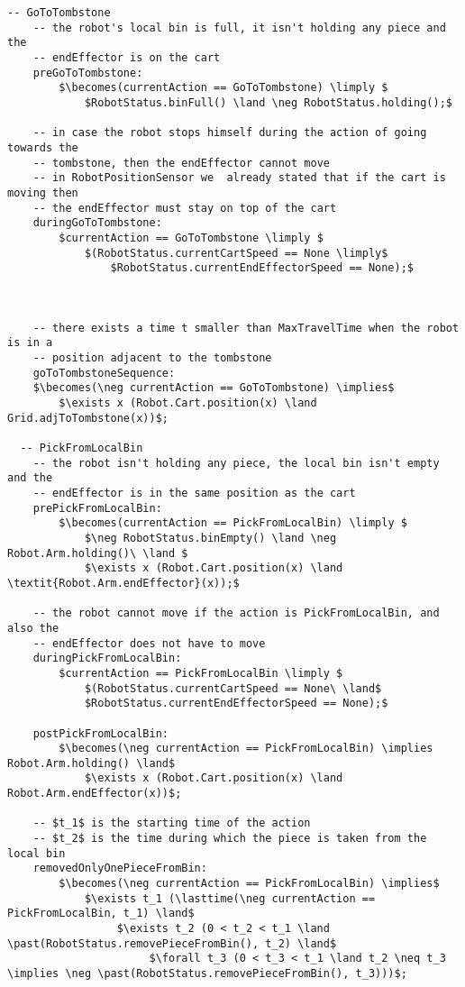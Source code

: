 \begin{lstlisting}[fontadjust, mathescape, frame=single]
  -- GoToTombstone
    -- the robot's local bin is full, it isn't holding any piece and the 
    -- endEffector is on the cart
    preGoToTombstone:
        $\becomes(currentAction == GoToTombstone) \limply $
            $RobotStatus.binFull() \land \neg RobotStatus.holding();$
    
    -- in case the robot stops himself during the action of going towards the 
    -- tombstone, then the endEffector cannot move 
    -- in RobotPositionSensor we  already stated that if the cart is moving then 
    -- the endEffector must stay on top of the cart
    duringGoToTombstone:
        $currentAction == GoToTombstone \limply $
            $(RobotStatus.currentCartSpeed == None \limply$ 
                $RobotStatus.currentEndEffectorSpeed == None);$



    -- there exists a time t smaller than MaxTravelTime when the robot is in a 
    -- position adjacent to the tombstone
    goToTombstoneSequence:
    $\becomes(\neg currentAction == GoToTombstone) \implies$
        $\exists x (Robot.Cart.position(x) \land Grid.adjToTombstone(x))$;

  -- PickFromLocalBin
    -- the robot isn't holding any piece, the local bin isn't empty and the 
    -- endEffector is in the same position as the cart
    prePickFromLocalBin:
        $\becomes(currentAction == PickFromLocalBin) \limply $
            $\neg RobotStatus.binEmpty() \land \neg Robot.Arm.holding()\ \land $
            $\exists x (Robot.Cart.position(x) \land \textit{Robot.Arm.endEffector}(x));$
    
    -- the robot cannot move if the action is PickFromLocalBin, and also the 
    -- endEffector does not have to move
    duringPickFromLocalBin:
        $currentAction == PickFromLocalBin \limply $
            $(RobotStatus.currentCartSpeed == None\ \land$
            $RobotStatus.currentEndEffectorSpeed == None);$
  
    postPickFromLocalBin:
        $\becomes(\neg currentAction == PickFromLocalBin) \implies Robot.Arm.holding() \land$
            $\exists x (Robot.Cart.position(x) \land Robot.Arm.endEffector(x))$;
            
    -- $t_1$ is the starting time of the action
    -- $t_2$ is the time during which the piece is taken from the local bin
    removedOnlyOnePieceFromBin:
        $\becomes(\neg currentAction == PickFromLocalBin) \implies$
            $\exists t_1 (\lasttime(\neg currentAction == PickFromLocalBin, t_1) \land$
                 $\exists t_2 (0 < t_2 < t_1 \land \past(RobotStatus.removePieceFromBin(), t_2) \land$
                      $\forall t_3 (0 < t_3 < t_1 \land t_2 \neq t_3 \implies \neg \past(RobotStatus.removePieceFromBin(), t_3)))$;
                      

\end{lstlisting}
